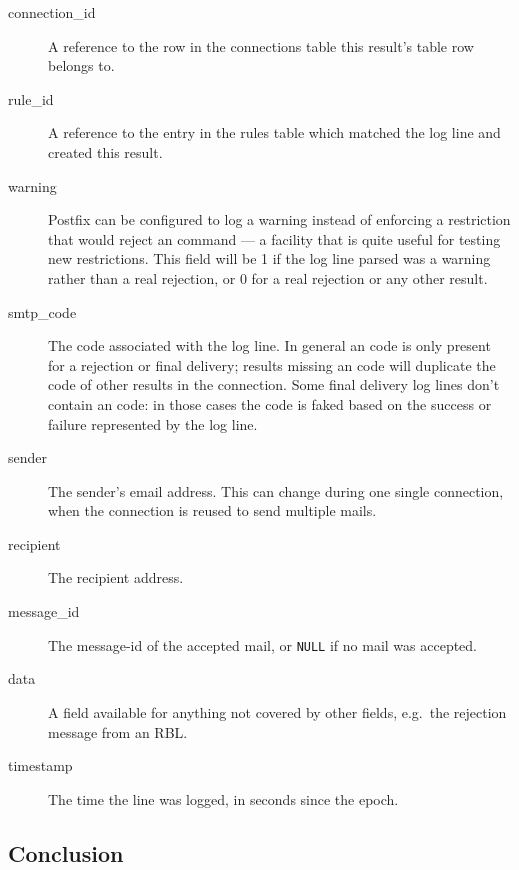 \documentclass[a4paper,12pt,draft]{article}
\begin{document}
\begin{description}

    \item [connection\_id] A reference to the row in the connections table
        this result's table row belongs to.

    \item [rule\_id] A reference to the entry in the rules table which
        matched the log line and created this result.

    \item [warning] Postfix can be configured to log a warning instead of
        enforcing a restriction that would reject an \SMTP{} command --- a
        facility that is quite useful for testing new restrictions.  This
        field will be 1 if the log line parsed was a warning rather than a
        real rejection, or 0 for a real rejection or any other result.

    \item [smtp\_code] The \SMTP{} code associated with the log line.  In
        general an \SMTP{} code is only present for a rejection or final
        delivery; results missing an \SMTP{} code will duplicate the
        \SMTP{} code of other results in the connection.  Some final
        delivery log lines don't contain an \SMTP{} code: in those cases
        the code is faked based on the success or failure represented by
        the log line.

    \item [sender] The sender's email address.  This can change during one
        single connection, when the connection is reused to send multiple
        mails.

    \item [recipient] The recipient address.

    \item [message\_id] The message-id of the accepted mail, or
        \texttt{NULL} if no mail was accepted.

    \item [data] A field available for anything not covered by other
        fields, e.g.\ the rejection message from an RBL\@.

    \item [timestamp] The time the line was logged, in seconds since the
        epoch.

\end{description}

\subsection{Conclusion}
\end{document}
